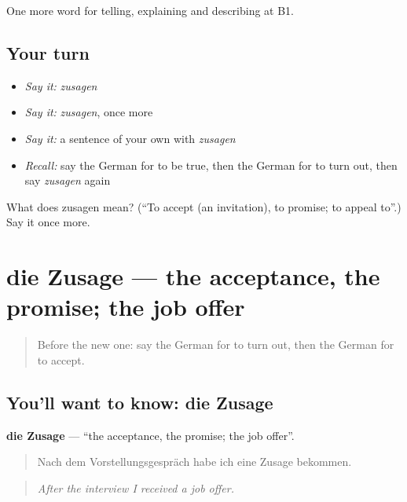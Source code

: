 \begin{grammarlens}[title={What you've built}]
One more word for telling, explaining and describing at B1.
\end{grammarlens}

\subsection*{Your turn}
\begin{itemize}
\raggedright
  \item \emph{Say it:} \emph{zusagen}
  \item \emph{Say it:} \emph{zusagen}, once more
  \item \emph{Say it:} a sentence of your own with \emph{zusagen}
  \item \emph{Recall:} say the German for to be true, then the German for to turn out, then say \emph{zusagen} again
\end{itemize}

\begin{tcolorbox}[breakable,colback=teal!4,colframe=teal!35!black,title={Before you move on}]
What does zusagen mean? (\textquotedblleft{}To accept (an invitation), to promise; to appeal to\textquotedblright{}.) Say it once more.
\end{tcolorbox}
\section[die Zusage]{die Zusage — the acceptance, the promise; the job offer}

\label{lesson:GE-C371-zusage}



\begin{quote}
Before the new one: say the German for to turn out, then the German for to accept.
\end{quote}

\subsection*{You'll want to know: die Zusage}
\textbf{die Zusage} — \textquotedblleft{}the acceptance, the promise; the job offer\textquotedblright{}.

\begin{quote}
Nach dem Vorstellungsgespräch habe ich eine Zusage bekommen.
\end{quote}

\begin{quote}
\emph{After the interview I received a job offer.}
\end{quote}

